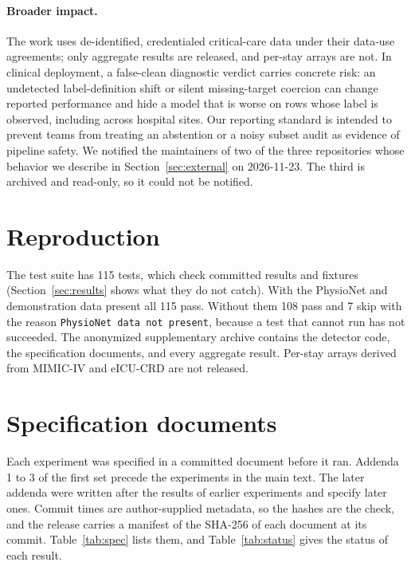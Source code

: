 \documentclass[10pt]{article}
\theoremstyle{definition}
\begin{document}

\paragraph{Broader impact.} The work uses de-identified, credentialed critical-care data under their data-use agreements; only aggregate results are released, and per-stay arrays are not. In clinical deployment, a false-clean diagnostic verdict carries concrete risk: an undetected label-definition shift or silent missing-target coercion can change reported performance and hide a model that is worse on rows whose label is observed, including across hospital sites. Our reporting standard is intended to prevent teams from treating an abstention or a noisy subset audit as evidence of pipeline safety. We notified the maintainers of two of the three repositories whose behavior we describe in Section~\ref{sec:external} on 2026-11-23. The third is archived and read-only, so it could not be notified.




\appendix
\section{Reproduction}
\label{apd:repro}
The test suite has 115 tests, which check committed results and fixtures (Section~\ref{sec:results} shows what they do not catch). With the PhysioNet and demonstration data present all 115 pass. Without them 108 pass and 7 skip with the reason \texttt{PhysioNet data not present}, because a test that cannot run has not succeeded. The anonymized supplementary archive contains the detector code, the specification documents, and every aggregate result. Per-stay arrays derived from MIMIC-IV and eICU-CRD are not released.

\section{Specification documents}
\label{apd:prereg}
Each experiment was specified in a committed document before it ran. Addenda 1 to 3 of the first set precede the experiments in the main text. The later addenda were written after the results of earlier experiments and specify later ones. Commit times are author-supplied metadata, so the hashes are the check, and the release carries a manifest of the SHA-256 of each document at its commit. Table~\ref{tab:spec} lists them, and Table~\ref{tab:status} gives the status of each result.
\end{document}
